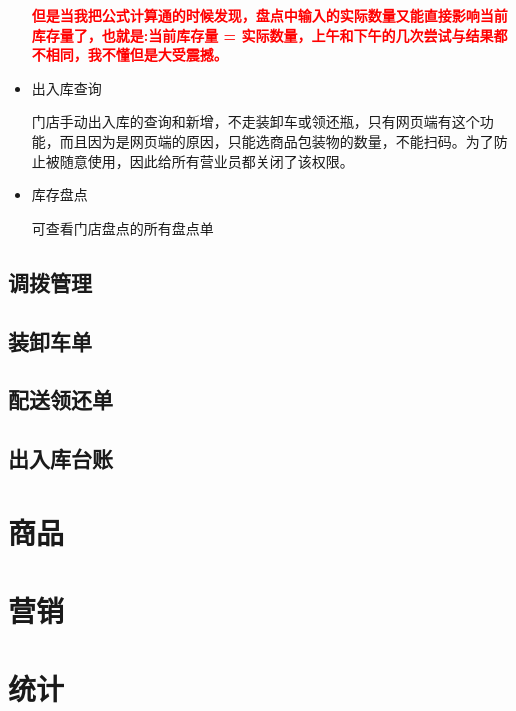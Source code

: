 \documentclass[UTF8]{ctexart}
\begin{document}
\begin{itemize}
	\textcolor{red}{\textbf{但是当我把公式计算通的时候发现，盘点中输入的实际数量又能直接影响当前库存量了，也就是:当前库存量 = 实际数量，上午和下午的几次尝试与结果都不相同，我不懂但是大受震撼。}}
	
	
	\item 出入库查询
	
	门店手动出入库的查询和新增，不走装卸车或领还瓶，只有网页端有这个功能，而且因为是网页端的原因，只能选商品包装物的数量，不能扫码。为了防止被随意使用，因此给所有营业员都关闭了该权限。
	
	\item 库存盘点
	
	可查看门店盘点的所有盘点单
	
	
	
\end{itemize}


\subsection{调拨管理}




\subsection{装卸车单}




\subsection{配送领还单}




\subsection{出入库台账}





\section{商品}

\section{营销}

\section{统计}
\end{document}

